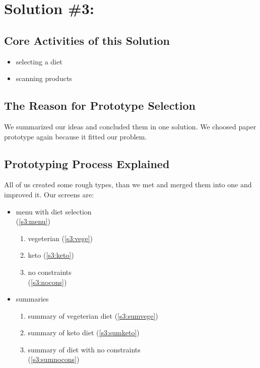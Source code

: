 \section{Solution \#3:}

\subsection{Core Activities of this Solution}

\begin{itemize}
	\item selecting a diet
	
	\item scanning products
\end{itemize}

\subsection{The Reason for Prototype Selection}

We summarized our ideas and concluded them in one solution. We choosed paper prototype again because it fitted our problem.

\subsection{Prototyping Process Explained}

All of us created some rough types, than we met and merged them into one and improved it. Our screens are:
\begin{itemize}
	\item menu with diet selection\\
	(\autoref{s3:menu})
	
	\begin{enumerate}
		\item vegeterian
     	(\autoref{s3:vege})
    	\item keto
    	(\autoref{s3:keto})
    	\item no constraints\\
    	(\autoref{s3:nocons})
	\end{enumerate}
   	
   	\item summaries\\
   	\begin{enumerate}
		\item summary of vegeterian diet
     	(\autoref{s3:sumvege})
    	\item summary of keto diet
    	(\autoref{s3:sumketo})
    	\item summary of diet with no constraints\\
    	(\autoref{s3:sumnocons})
	\end{enumerate}
	
\end{itemize}

